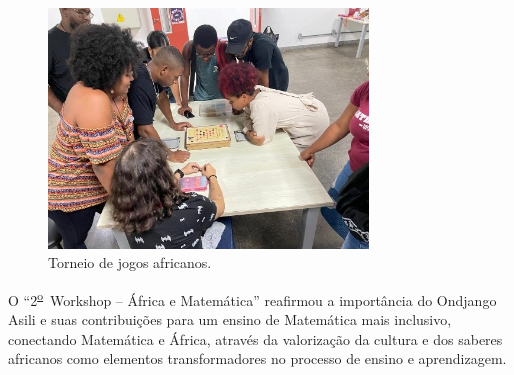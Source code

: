 \documentclass{hipatia}
\newcommand{\superau}{\textsuperscript{\underline{a}}~}
\newcommand{\superou}{\textsuperscript{\underline{o}}~}
\begin{document}
\begin{figure}[htb]
    \centering
    \includegraphics[width=8.5cm]{WAM4.jpg}
    \caption{Torneio de jogos africanos.}
 \label{WAM4}
\end{figure}

O ``2\superou Workshop – África e Matemática'' reafirmou a importância do Ondjango Asili e suas contribuições para um ensino de Matemática mais inclusivo, conectando Matemática e África, através da valorização da cultura e dos saberes africanos como elementos transformadores no processo de ensino e aprendizagem.




\end{document}
